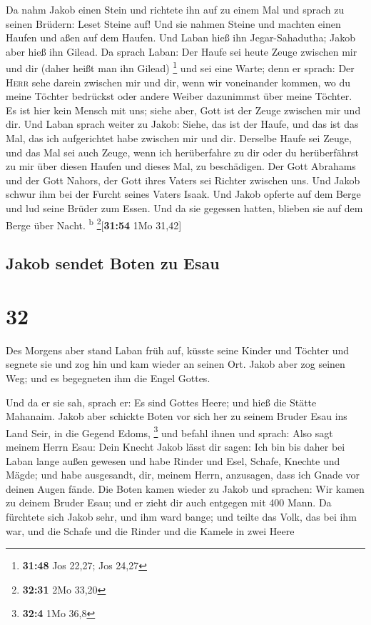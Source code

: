  Da nahm Jakob einen Stein und richtete ihn auf zu einem
Mal  und sprach zu seinen Brüdern: Leset Steine auf! Und
sie nahmen Steine und machten einen Haufen und aßen auf dem Haufen.
 Und Laban hieß ihn Jegar-Sahadutha; Jakob aber hieß ihn
Gilead.  Da sprach Laban: Der Haufe sei heute Zeuge
zwischen mir und dir (daher heißt man ihn Gilead) \footnote{\textbf{31:48}
  Jos 22,27; Jos 24,27}  und sei eine Warte; denn er
sprach: Der \textsc{Herr} sehe darein zwischen mir und dir, wenn wir
voneinander kommen,  wo du meine Töchter bedrückst oder
andere Weiber dazunimmst über meine Töchter. Es ist hier kein Mensch mit
uns; siehe aber, Gott ist der Zeuge zwischen mir und dir.
 Und Laban sprach weiter zu Jakob: Siehe, das ist der
Haufe, und das ist das Mal, das ich aufgerichtet habe zwischen mir und
dir.  Derselbe Haufe sei Zeuge, und das Mal sei auch
Zeuge, wenn ich herüberfahre zu dir oder du herüberfährst zu mir über
diesen Haufen und dieses Mal, zu beschädigen.  Der Gott
Abrahams und der Gott Nahors, der Gott ihres Vaters sei Richter zwischen
uns.  Und Jakob schwur ihm bei der Furcht seines Vaters
Isaak. Und Jakob opferte auf dem Berge und lud seine Brüder zum Essen.
Und da sie gegessen hatten, blieben sie auf dem Berge über Nacht.
\textsuperscript{b} \footnote{\textbf{32:31} 2Mo 33,20}{[}\textbf{31:54}
1Mo 31,42{]}

\hypertarget{jakob-sendet-boten-zu-esau}{%
\subsection{Jakob sendet Boten zu
Esau}\label{jakob-sendet-boten-zu-esau}}

\hypertarget{section-31}{%
\section{32}\label{section-31}}

 Des Morgens aber stand Laban früh auf, küsste seine
Kinder und Töchter und segnete sie und zog hin und kam wieder an seinen
Ort.  Jakob aber zog seinen Weg; und es begegneten ihm die
Engel Gottes.

 Und da er sie sah, sprach er: Es sind Gottes Heere; und
hieß die Stätte Mahanaim.  Jakob aber schickte Boten vor
sich her zu seinem Bruder Esau ins Land Seir, in die Gegend Edoms,
\footnote{\textbf{32:4} 1Mo 36,8}  und befahl ihnen und
sprach: Also sagt meinem Herrn Esau: Dein Knecht Jakob lässt dir sagen:
Ich bin bis daher bei Laban lange außen gewesen  und habe
Rinder und Esel, Schafe, Knechte und Mägde; und habe ausgesandt, dir,
meinem Herrn, anzusagen, dass ich Gnade vor deinen Augen fände.
 Die Boten kamen wieder zu Jakob und sprachen: Wir kamen
zu deinem Bruder Esau; und er zieht dir auch entgegen mit 400 Mann.
 Da fürchtete sich Jakob sehr, und ihm ward bange; und
teilte das Volk, das bei ihm war, und die Schafe und die Rinder und die
Kamele in zwei Heere

